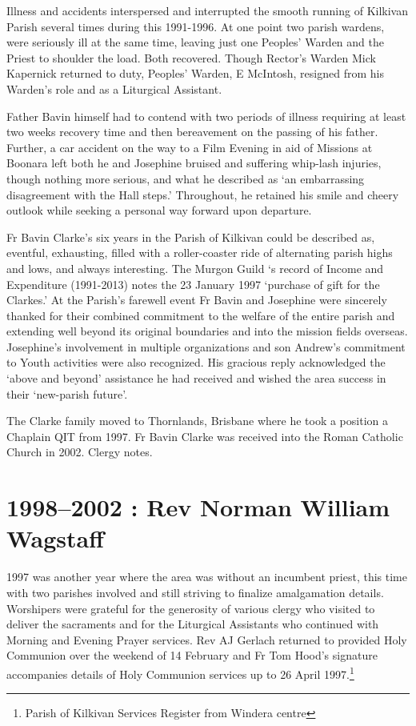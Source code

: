 Illness and accidents interspersed and interrupted the smooth running of Kilkivan Parish several times during this 1991-1996. At one point two parish wardens, were seriously ill at the same time, leaving just one Peoples' Warden and the Priest to shoulder the load. Both recovered. Though Rector's Warden Mick Kapernick returned to duty, Peoples' Warden, E McIntosh, resigned from his Warden's role and as a Liturgical Assistant.

Father Bavin himself had to contend with two periods of illness requiring at least two weeks recovery time and then bereavement on the passing of his father. Further, a car accident on the way to a Film Evening in aid of Missions at Boonara left both he and Josephine bruised and suffering whip-lash injuries, though nothing more serious, and what he described as `an embarrassing disagreement with the Hall steps.' Throughout, he retained his smile and cheery outlook while seeking a personal way forward upon departure.

Fr Bavin Clarke's six years in the Parish of Kilkivan could be described as, eventful, exhausting, filled with a roller-coaster ride of alternating parish highs and lows, and always interesting. The Murgon Guild `s record of Income and Expenditure (1991-2013) notes the 23 January 1997 `purchase of gift for the Clarkes.' At the Parish's farewell event Fr Bavin and Josephine were sincerely thanked for their combined commitment to the welfare of the entire parish and extending well beyond its original boundaries and into the mission fields overseas. Josephine's involvement in multiple organizations and son Andrew's commitment to Youth activities were also recognized. His gracious reply acknowledged the `above and beyond' assistance he had received and wished the area success in their `new-parish future'.

The Clarke family moved to Thornlands, Brisbane where he took a position a Chaplain QIT from 1997. Fr Bavin Clarke was received into the Roman Catholic Church in 2002. Clergy notes.

\hypertarget{rev-norman-william-wagstaff}{%
\section{1998--2002 : Rev Norman William Wagstaff}\label{rev-norman-william-wagstaff}}

1997 was another year where the area was without an incumbent priest, this time with two parishes involved and still striving to finalize amalgamation details. Worshipers were grateful for the generosity of various clergy who visited to deliver the sacraments and for the Liturgical Assistants who continued with Morning and Evening Prayer services. Rev AJ Gerlach returned to provided Holy Communion over the weekend of 14 February and Fr Tom Hood's signature accompanies details of Holy Communion services up to 26 April 1997.\footnote{Parish of Kilkivan Services Register from Windera centre}

